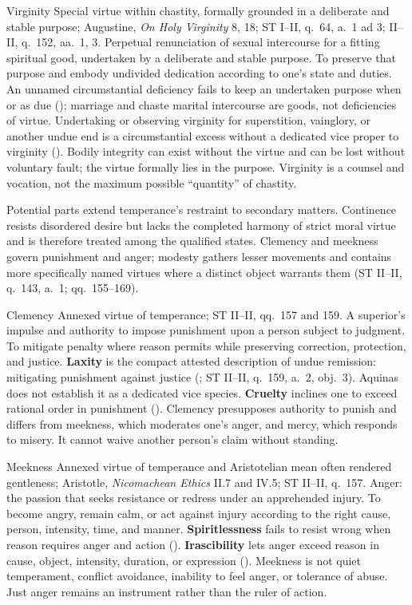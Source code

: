 \virtuedossier
  {Virginity}
  {Special virtue within chastity, formally grounded in a deliberate and stable purpose; Augustine, \emph{On Holy Virginity} 8, 18; ST I--II, q.~64, a.~1 ad 3; II--II, q.~152, aa.~1, 3.}
  {Perpetual renunciation of sexual intercourse for a fitting spiritual good, undertaken by a deliberate and stable purpose.}
  {To preserve that purpose and embody undivided dedication according to one's state and duties.}
  {An unnamed circumstantial deficiency fails to keep an undertaken purpose when or as due (); marriage and chaste marital intercourse are goods, not deficiencies of virtue.}
  {Undertaking or observing virginity for superstition, vainglory, or another undue end is a circumstantial excess without a dedicated vice proper to virginity ().}
  {Bodily integrity can exist without the virtue and can be lost without voluntary fault; the virtue formally lies in the purpose. Virginity is a counsel and vocation, not the maximum possible ``quantity'' of chastity.}


Potential parts extend temperance's restraint to secondary matters. Continence resists disordered desire but lacks the completed harmony of strict moral virtue and is therefore treated among the qualified states. Clemency and meekness govern punishment and anger; modesty gathers lesser movements and contains more specifically named virtues where a distinct object warrants them (ST II--II, q.~143, a.~1; qq.~155--169).

\virtuedossier
  {Clemency}
  {Annexed virtue of temperance; ST II--II, qq.~157 and 159.}
  {A superior's impulse and authority to impose punishment upon a person subject to judgment.}
  {To mitigate penalty where reason permits while preserving correction, protection, and justice.}
  {\textbf{Laxity} is the compact attested description of undue remission: mitigating punishment against justice (; ST II--II, q.~159, a.~2, obj.~3). Aquinas does not establish it as a dedicated vice species.}
  {\textbf{Cruelty} inclines one to exceed rational order in punishment ().}
  {Clemency presupposes authority to punish and differs from meekness, which moderates one's anger, and mercy, which responds to misery. It cannot waive another person's claim without standing.}

\virtuedossier
  {Meekness}
  {Annexed virtue of temperance and Aristotelian mean often rendered gentleness; Aristotle, \emph{Nicomachean Ethics} II.7 and IV.5; ST II--II, q.~157.}
  {Anger: the passion that seeks resistance or redress under an apprehended injury.}
  {To become angry, remain calm, or act against injury according to the right cause, person, intensity, time, and manner.}
  {\textbf{Spiritlessness} fails to resist wrong when reason requires anger and action ().}
  {\textbf{Irascibility} lets anger exceed reason in cause, object, intensity, duration, or expression ().}
  {Meekness is not quiet temperament, conflict avoidance, inability to feel anger, or tolerance of abuse. Just anger remains an instrument rather than the ruler of action.}


